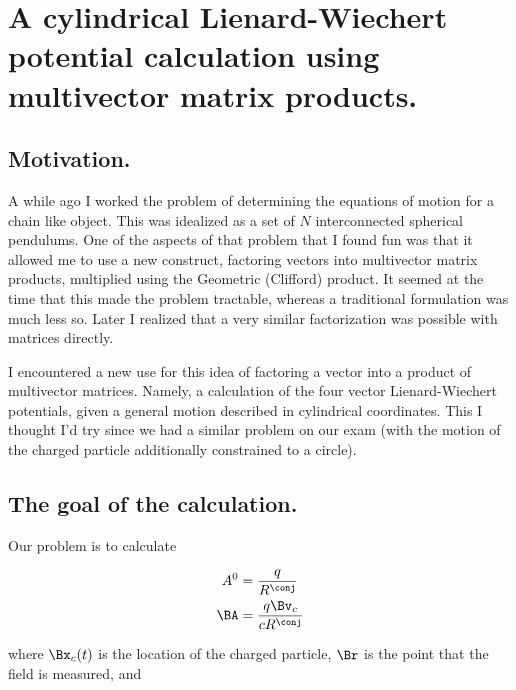 
%

\chapter{A cylindrical Lienard-Wiechert potential calculation using multivector matrix products.}
\label{chap:matrixVectorPotentials}
{}
\date{April 30, 2011}

\beginArtWithToc

\section{Motivation.}

A while ago I worked the problem of determining the equations of motion for a chain like object.  This was idealized as a set of $N$ interconnected spherical pendulums.  One of the aspects of that problem that I found fun was that it allowed me to use a new construct, factoring vectors into multivector matrix products, multiplied using the Geometric (Clifford) product.  It seemed at the time that this made the problem tractable, whereas a traditional formulation was much less so.  Later I realized that a very similar factorization was possible with matrices directly.

I encountered a new use for this idea of factoring a vector into a product of multivector matrices.  Namely, a calculation of the four vector Lienard-Wiechert potentials, given a general motion described in cylindrical coordinates.  This I thought I'd try since we had a similar problem on our exam (with the motion of the charged particle additionally constrained to a circle).

\section{The goal of the calculation.}

Our problem is to calculate

\begin{align}\label{eqn:matrixVectorPotentials:n}
A^0 &= \frac{q}{R^\conj} \\
\BA &= \frac{q \Bv_c}{c R^\conj}
\end{align}

where $\Bx_c(t)$ is the location of the charged particle, $\Br$ is the point that the field is measured, and 

